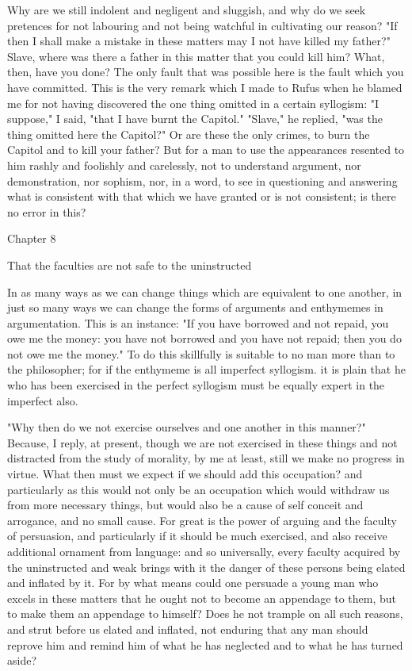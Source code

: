 \documentclass[a4paper]{article}
\begin{document}
Why are we still indolent and negligent and sluggish, and why do we
seek pretences for not labouring and not being watchful in cultivating
our reason? "If then I shall make a mistake in these matters may I
not have killed my father?" Slave, where was there a father in this
matter that you could kill him? What, then, have you done? The only
fault that was possible here is the fault which you have committed.
This is the very remark which I made to Rufus when he blamed me for
not having discovered the one thing omitted in a certain syllogism:
"I suppose," I said, "that I have burnt the Capitol." "Slave," he
replied, "was the thing omitted here the Capitol?" Or are these the
only crimes, to burn the Capitol and to kill your father? But for
a man to use the appearances resented to him rashly and foolishly
and carelessly, not to understand argument, nor demonstration, nor
sophism, nor, in a word, to see in questioning and answering what
is consistent with that which we have granted or is not consistent;
is there no error in this? 

Chapter 8

That the faculties are not safe to the uninstructed 

In as many ways as we can change things which are equivalent to one
another, in just so many ways we can change the forms of arguments
and enthymemes in argumentation. This is an instance: "If you have
borrowed and not repaid, you owe me the money: you have not borrowed
and you have not repaid; then you do not owe me the money." To do
this skillfully is suitable to no man more than to the philosopher;
for if the enthymeme is all imperfect syllogism. it is plain that
he who has been exercised in the perfect syllogism must be equally
expert in the imperfect also. 

"Why then do we not exercise ourselves and one another in this manner?"
Because, I reply, at present, though we are not exercised in these
things and not distracted from the study of morality, by me at least,
still we make no progress in virtue. What then must we expect if we
should add this occupation? and particularly as this would not only
be an occupation which would withdraw us from more necessary things,
but would also be a cause of self conceit and arrogance, and no small
cause. For great is the power of arguing and the faculty of persuasion,
and particularly if it should be much exercised, and also receive
additional ornament from language: and so universally, every faculty
acquired by the uninstructed and weak brings with it the danger of
these persons being elated and inflated by it. For by what means could
one persuade a young man who excels in these matters that he ought
not to become an appendage to them, but to make them an appendage
to himself? Does he not trample on all such reasons, and strut before
us elated and inflated, not enduring that any man should reprove him
and remind him of what he has neglected and to what he has turned
aside? 
\end{document}
